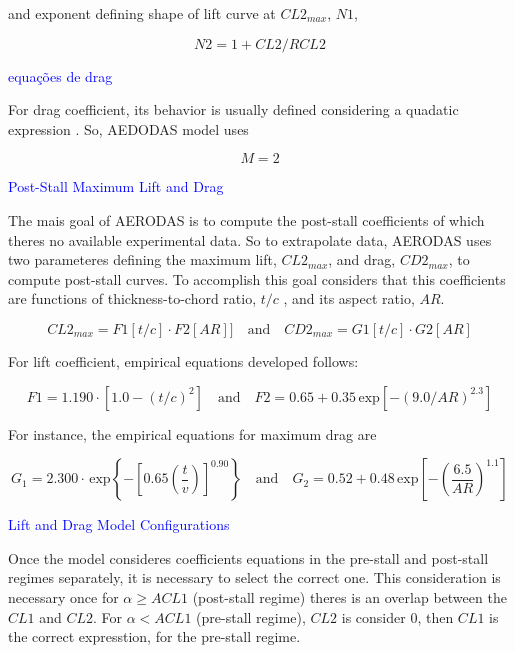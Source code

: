 and exponent defining shape of lift curve at $CL2_{max}$, $N1$,

\begin{equation}
    N2 = 1 + CL2 / RCL2
\end{equation}


\textcolor{blue}{equações de drag}

For drag coefficient, its behavior is usually defined considering a quadatic expression \cite{spera_models_2008}. So, AEDODAS model uses 

\begin{equation}
    M = 2
\end{equation}

\textcolor{blue}{Post-Stall Maximum Lift and Drag}

The mais goal of AERODAS is to compute the post-stall coefficients of which theres no available experimental data. So to extrapolate data, AERODAS uses two parameteres defining the maximum lift, $CL2_{max}$, and drag, $CD2_{max}$, to compute post-stall curves. To accomplish this goal \cite{spera_models_2008} considers  that this coefficients are functions of thickness-to-chord ratio, $t/c$ , and its aspect ratio, $AR$.

\begin{equation}
    CL2_{max} = F1 \left[ t/c \right] \cdot F2 \left[ AR \right]] \quad \text{and} \quad CD2_{max} = G1 \left[ t/c \right] \cdot G2 \left[ AR \right]
\end{equation}

For lift coefficient, empirical equations developed follows:

\begin{equation}
    F1=1.190\cdot\left[1.0-\left(t/c\right)^{2}\right] \quad \text{and} \quad F2= 0.65 + 0.35\,\mathrm{exp}\left[-\left(9.0\slash{A}R\right)^{2.3}\right]
\end{equation}

For instance, the empirical equations for maximum drag are

\begin{equation}
    G_1 = 2.300\cdot\,\mathrm{exp}\left\{-\left[0.65\left(\frac{t}{v}\right)\right]^{0.90}\right\} \quad \text{and} \quad G_2 = 0.52 + 0.48\,\mathrm{exp}\left[-\left(\frac{6.5}{A R}\right)^{1.1}\right]
\end{equation}



\textcolor{blue}{Lift and Drag Model Configurations}

Once the model consideres coefficients equations in the pre-stall and post-stall regimes separately, it is necessary to select the correct one. This consideration is necessary once for $\alpha \geq ACL1$ (post-stall regime) theres is an overlap between the $CL1$ and $CL2$. For $\alpha < ACL1$ (pre-stall regime), $CL2$ is consider 0, then $CL1$ is the correct expresstion, for the pre-stall regime.


